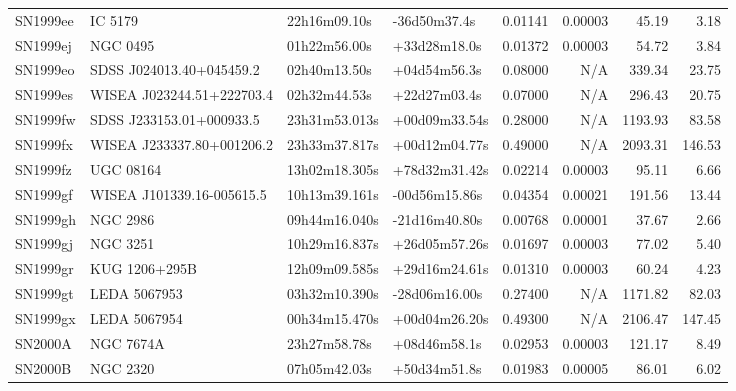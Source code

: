 \begin{longtable}{llllrrrr}
SN1999ee         &                         IC 5179 &    22h16m09.10s &    -36d50m37.4s &  0.01141 &  0.00003 &    45.19 &        3.18 \\
SN1999ej         &                        NGC 0495 &    01h22m56.00s &    +33d28m18.0s &  0.01372 &  0.00003 &    54.72 &        3.84 \\
SN1999eo         &        SDSS J024013.40+045459.2 &    02h40m13.50s &    +04d54m56.3s &  0.08000 &      N/A &   339.34 &       23.75 \\
SN1999es         &       WISEA J023244.51+222703.4 &    02h32m44.53s &    +22d27m03.4s &  0.07000 &      N/A &   296.43 &       20.75 \\
SN1999fw         &        SDSS J233153.01+000933.5 &   23h31m53.013s &   +00d09m33.54s &  0.28000 &      N/A &  1193.93 &       83.58 \\
SN1999fx         &       WISEA J233337.80+001206.2 &   23h33m37.817s &   +00d12m04.77s &  0.49000 &      N/A &  2093.31 &      146.53 \\
SN1999fz         &                       UGC 08164 &   13h02m18.305s &   +78d32m31.42s &  0.02214 &  0.00003 &    95.11 &        6.66 \\
SN1999gf         &       WISEA J101339.16-005615.5 &   10h13m39.161s &   -00d56m15.86s &  0.04354 &  0.00021 &   191.56 &       13.44 \\
SN1999gh         &                        NGC 2986 &   09h44m16.040s &   -21d16m40.80s &  0.00768 &  0.00001 &    37.67 &        2.66 \\
SN1999gj         &                        NGC 3251 &   10h29m16.837s &   +26d05m57.26s &  0.01697 &  0.00003 &    77.02 &        5.40 \\
SN1999gr         &                   KUG 1206+295B &   12h09m09.585s &   +29d16m24.61s &  0.01310 &  0.00003 &    60.24 &        4.23 \\
SN1999gt         &                    LEDA 5067953 &   03h32m10.390s &   -28d06m16.00s &  0.27400 &      N/A &  1171.82 &       82.03 \\
SN1999gx         &                    LEDA 5067954 &   00h34m15.470s &   +00d04m26.20s &  0.49300 &      N/A &  2106.47 &      147.45 \\
SN2000A          &                       NGC 7674A &    23h27m58.78s &    +08d46m58.1s &  0.02953 &  0.00003 &   121.17 &        8.49 \\
SN2000B          &                        NGC 2320 &    07h05m42.03s &    +50d34m51.8s &  0.01983 &  0.00005 &    86.01 &        6.02 \\

\end{longtable}
